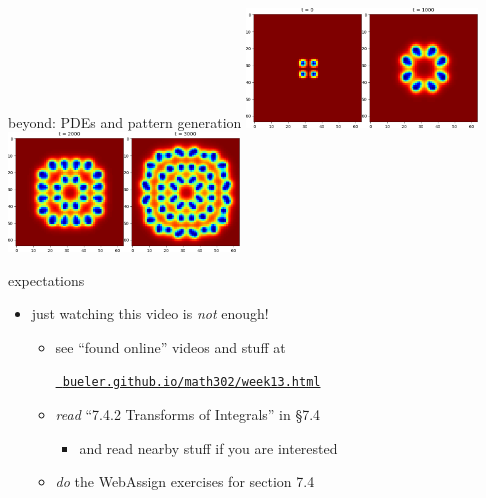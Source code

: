 \documentclass[urlcolor=blue,dvipsnames]{beamer}
\begin{document}
\begin{frame}{beyond: PDEs and pattern generation}
\mbox{\includegraphics[width=0.23\textwidth]{figs/pattern0}\quad\includegraphics[width=0.23\textwidth]{figs/pattern2}\quad\includegraphics[width=0.23\textwidth]{figs/pattern4}\quad\includegraphics[width=0.23\textwidth]{figs/pattern6}}

\bigskip
\end{frame}


\begin{frame}{expectations}

\begin{itemize}
\item just watching this video is \emph{not} enough!
     \begin{itemize}
     \item see ``found online'' videos and stuff at

     \centerline{\href{https://bueler.github.io/math302/week13.html}{\tt \color{cyan} bueler.github.io/math302/week13.html}}
     \item \emph{read} ``7.4.2 Transforms of Integrals'' in \S7.4
         \begin{itemize}
         \item and read nearby stuff if you are interested
         \end{itemize}
     \item \emph{do} the WebAssign exercises for section 7.4
     \end{itemize}
\end{itemize}
\end{frame}
\end{document}
